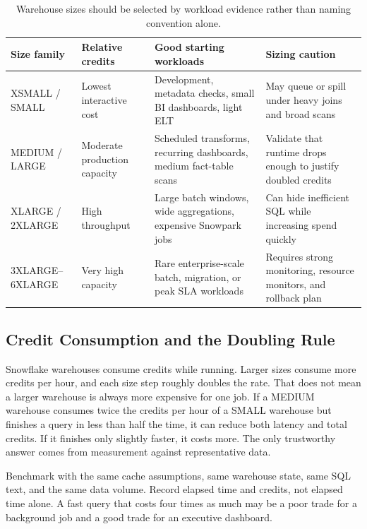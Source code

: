 \begin{table}[H]
\centering
\small
\begin{tabular}{@{}p{2.6cm}p{3.0cm}p{4.0cm}p{4.2cm}@{}}
\toprule
\textbf{Size family} & \textbf{Relative credits} & \textbf{Good starting workloads} & \textbf{Sizing caution} \\
\midrule
XSMALL / SMALL & Lowest interactive cost & Development, metadata checks, small BI dashboards, light ELT & May queue or spill under heavy joins and broad scans \\
MEDIUM / LARGE & Moderate production capacity & Scheduled transforms, recurring dashboards, medium fact-table scans & Validate that runtime drops enough to justify doubled credits \\
XLARGE / 2XLARGE & High throughput & Large batch windows, wide aggregations, expensive Snowpark jobs & Can hide inefficient SQL while increasing spend quickly \\
3XLARGE--6XLARGE & Very high capacity & Rare enterprise-scale batch, migration, or peak SLA workloads & Requires strong monitoring, resource monitors, and rollback plan \\
\bottomrule
\end{tabular}
\caption{Warehouse sizes should be selected by workload evidence rather than naming convention alone.}
\label{tab:chapter2-sizing-guidance}
\end{table}

\subsection{Credit Consumption and the Doubling Rule}
Snowflake warehouses consume credits while running. Larger sizes consume more credits per hour, and each size step roughly doubles the rate. That does not mean a larger warehouse is always more expensive for one job. If a MEDIUM warehouse consumes twice the credits per hour of a SMALL warehouse but finishes a query in less than half the time, it can reduce both latency and total credits. If it finishes only slightly faster, it costs more. The only trustworthy answer comes from measurement against representative data.

\begin{tipbox}
Benchmark with the same cache assumptions, same warehouse state, same SQL text, and the same data volume. Record elapsed time and credits, not elapsed time alone. A fast query that costs four times as much may be a poor trade for a background job and a good trade for an executive dashboard.
\end{tipbox}

